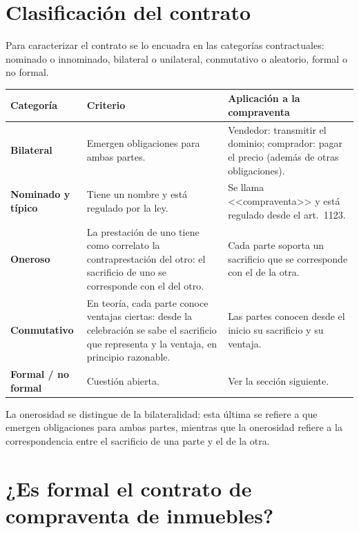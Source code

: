 \documentclass[12pt,oneside]{book}
\begin{document}
\section{Clasificación del contrato}

Para caracterizar el contrato se lo encuadra en las categorías contractuales: nominado o innominado, bilateral o unilateral, conmutativo o aleatorio, formal o no formal.

\begin{table}[H]
\centering
\small
\begin{tabularx}{\textwidth}{>{\raggedright\arraybackslash}p{} >{\raggedright\arraybackslash}X >{\raggedright\arraybackslash}X}
\toprule
\textbf{Categoría} & \textbf{Criterio} & \textbf{Aplicación a la compraventa} \\
\midrule
\textbf{Bilateral} &
Emergen obligaciones para ambas partes. &
Vendedor: transmitir el dominio; comprador: pagar el precio (además de otras obligaciones). \\

\textbf{Nominado y típico} &
Tiene un nombre y está regulado por la ley. &
Se llama <<compraventa>> y está regulado desde el art.~1123. \\

\textbf{Oneroso} &
La prestación de uno tiene como correlato la contraprestación del otro: el sacrificio de uno se corresponde con el del otro. &
Cada parte soporta un sacrificio que se corresponde con el de la otra. \\

\textbf{Conmutativo} &
En teoría, cada parte conoce ventajas ciertas: desde la celebración se sabe el sacrificio que representa y la ventaja, en principio razonable. &
Las partes conocen desde el inicio su sacrificio y su ventaja. \\

\textbf{Formal / no formal} &
Cuestión abierta. &
Ver la sección siguiente. \\
\bottomrule
\end{tabularx}
\end{table}

\begin{note}
La onerosidad se distingue de la bilateralidad: esta última se refiere a que emergen obligaciones para ambas partes, mientras que la onerosidad refiere a la correspondencia entre el sacrificio de una parte y el de la otra.
\end{note}

\section{¿Es formal el contrato de compraventa de inmuebles?}
\end{document}
